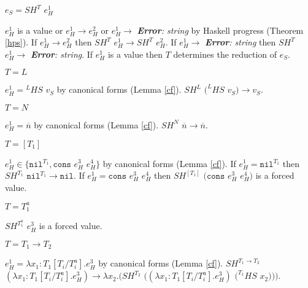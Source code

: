 \begin{case}

$e_{S}=SH^{T}$ $e_{H}^{1}$

$e_{H}^{1}$ is a value or $e_{H}^{1}\rightarrow e_{H}^{2}$ or $e_{H}^{1}\rightarrow$ \emph{\textbf{Error}: string} by Haskell progress (Theorem \ref{hps}).  If $e_{H}^{1}\rightarrow e_{H}^{2}$ then $SH^{T}$ $e_{H}^{1}\rightarrow SH^{T}$ $e_{H}^{2}$.  If $e_{H}^{1}\rightarrow$ \emph{\textbf{Error}: string} then $SH^{T}$ $e_{H}^{1}\rightarrow$ \emph{\textbf{Error}: string}.  If $e_{H}^{1}$ is a value then $T$ determines the reduction of $e_{S}$.

\begin{subcase}

$T=L$

$e_{H}^{1}={^{L}H}S$ $v_{S}$ by canonical forms (Lemma \ref{cf}).  $SH^{L}$ $(^{L}HS$ $v_{S})\rightarrow v_{S}$.

\end{subcase}

\begin{subcase}

$T=N$

$e_{H}^{1}=\overline{n}$ by canonical forms (Lemma \ref{cf}).  $SH^{N}$ $\overline{n}\rightarrow\overline{n}$.

\end{subcase}

\begin{subcase}

$T=[T_{1}]$

$e_{H}^{1}\in\lbrace\mathtt{nil}^{T_{1}},\mathtt{cons}$ $e_{H}^{3}$ $e_{H}^{4}\rbrace$ by canonical forms (Lemma \ref{cf}).  If $e_{H}^{1}=\mathtt{nil}^{T_{1}}$ then $SH^{T_{1}}$ $\mathtt{nil}^{T_{1}}\rightarrow\mathtt{nil}$.  If $e_{H}^{1}=\mathtt{cons}$ $e_{H}^{3}$ $e_{H}^{4}$ then $SH^{[T_{1}]}$ $(\mathtt{cons}$ $e_{H}^{3}$ $e_{H}^{4})$ is a forced value.

\end{subcase}

\begin{subcase}

$T=T_{1}^{a}$

$SH^{T_{1}^{a}}$ $e_{H}^{3}$ is a forced value.

\end{subcase}

\begin{subcase}

$T=T_{1}\rightarrow T_{2}$

$e_{H}^{1}=\lambda x_{1}:T_{1}[T_{i}/T_{i}^{a}].e_{H}^{3}$ by canonical forms (Lemma \ref{cf}).  $SH^{T_{1}\rightarrow T_{2}}$ $(\lambda x_{1}:T_{1}[T_{i}/T_{i}^{a}].e_{H}^{3})\rightarrow\lambda x_{2}.(SH^{T_{2}}$ $((\lambda x_{1}:T_{1}[T_{i}/T_{i}^{a}].e_{H}^{3})$ $(^{T_{1}}HS$ $x_{2})))$.


\end{subcase}
\end{case}
